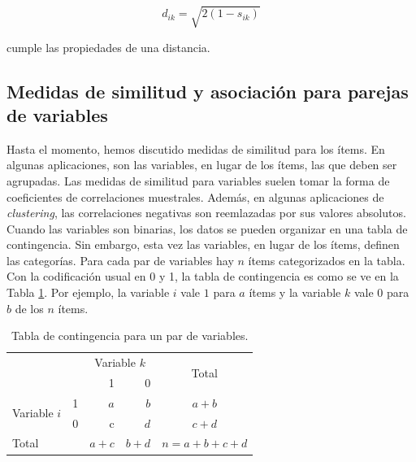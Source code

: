 \documentclass[a4paper, 20pt]{article}
\begin{document}
$$ d_{ik}=\sqrt{2(1-s_{ik})}$$

cumple las propiedades de una distancia.

\subsection{Medidas de similitud y asociación para parejas de variables}

Hasta el momento, hemos discutido medidas de similitud para los ítems. En algunas aplicaciones, son las variables, en lugar de los ítems, las que deben ser agrupadas. Las medidas de similitud para variables suelen tomar la forma de coeficientes de correlaciones muestrales. Además, en algunas aplicaciones de \textit{clustering}, las correlaciones negativas son reemlazadas por sus valores absolutos.\\
Cuando las variables son binarias, los datos se pueden organizar en una tabla de contingencia. Sin embargo, esta vez las variables, en lugar de los ítems, definen las categorías. Para cada par de variables hay $n$ ítems categorizados en la tabla. Con la codificación usual en 0 y 1, la tabla de contingencia es como se ve en la Tabla \ref{tab:contingencia_var}. Por ejemplo, la variable $i$ vale $1$ para $a$ ítems y la variable $k$ vale $0$ para $b$ de los $n$ ítems.\\

\begin{table}[h]
  \centering
  \caption{Tabla de contingencia para un par de variables.}
  \label{tab:contingencia_var}
\resizebox{7.5cm}{!} {
\begin{tabular}{llrrrr}
\toprule
\multicolumn{2}{l}{\multirow{2}{*}{}} & \multicolumn{2}{c}{Variable $k$} & \multicolumn{2}{c}{\multirow{2}{*}{Total}} \\\cmidrule{3-4}
\multicolumn{2}{l}{}                  & 1             & 0       & \multicolumn{2}{c}{}                        \\ \hline
\multirow{2}{*}{Variable $i$}       & 1      & $a$          & $b$       & \multicolumn{2}{c}{$a+b$}                     \\
                              & 0      & c            & $d$       & \multicolumn{2}{c}{$c+d$}                     \\ \hline
\multicolumn{2}{l}{Total}            & $a+c$          & $b+d$     & \multicolumn{2}{c}{$n=a+b+c+d$}\\
\bottomrule            
\end{tabular}
}
\end{table}
\end{document}
